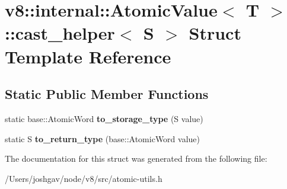 \hypertarget{structv8_1_1internal_1_1_atomic_value_1_1cast__helper}{}\section{v8\+:\+:internal\+:\+:Atomic\+Value$<$ T $>$\+:\+:cast\+\_\+helper$<$ S $>$ Struct Template Reference}
\label{structv8_1_1internal_1_1_atomic_value_1_1cast__helper}
\subsection*{Static Public Member Functions}
\begin{DoxyCompactItemize}
\item 
static base\+::\+Atomic\+Word {\bfseries to\+\_\+storage\+\_\+type} (S value)\hypertarget{structv8_1_1internal_1_1_atomic_value_1_1cast__helper_a83abbc12835e3caaf71a5700ec6b3166}{}\label{structv8_1_1internal_1_1_atomic_value_1_1cast__helper_a83abbc12835e3caaf71a5700ec6b3166}

\item 
static S {\bfseries to\+\_\+return\+\_\+type} (base\+::\+Atomic\+Word value)\hypertarget{structv8_1_1internal_1_1_atomic_value_1_1cast__helper_a57319024d1d501070861399f71d86da0}{}\label{structv8_1_1internal_1_1_atomic_value_1_1cast__helper_a57319024d1d501070861399f71d86da0}

\end{DoxyCompactItemize}


The documentation for this struct was generated from the following file\+:\begin{DoxyCompactItemize}
\item 
/\+Users/joshgav/node/v8/src/atomic-\/utils.\+h\end{DoxyCompactItemize}

